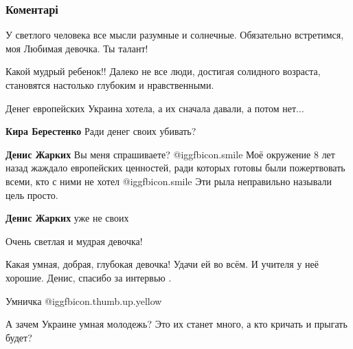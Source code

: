  
 
 
 
 
\subsubsection{Коментарі}

\begin{itemize} %
У светлого человека все мысли разумные и солнечные. Обязательно встретимся, моя Любимая девочка. Ты талант!

Какой мудрый ребенок!! Далеко не все люди, достигая солидного возраста, становятся настолько глубоким и нравственными.

Денег европейских Украина хотела, а их сначала давали, а потом нет...

\begin{itemize} %
\textbf{Кира Берестенко} Ради денег своих убивать?

\textbf{Денис Жарких} Вы меня спрашиваете?  @igg{fbicon.smile}  Моё окружение 8 лет назад жаждало европейских ценностей, ради которых готовы были пожертвовать всеми, кто с ними не хотел  @igg{fbicon.smile}  Эти рыла неправильно называли цель просто.

\textbf{Денис Жарких} уже не своих
\end{itemize} %

Очень светлая и мудрая девочка!

Какая умная, добрая, глубокая девочка! Удачи ей во всём.
И учителя у неё хорошие.
Денис, спасибо за интервью .

Умничка  @igg{fbicon.thumb.up.yellow} 

А зачем Украине умная молодежь? Это их станет много, а кто кричать и прыгать будет?

\end{itemize} %
